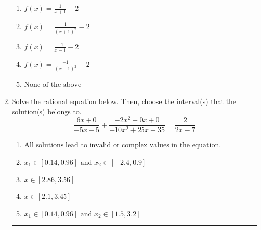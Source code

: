 \documentclass[14pt]{extbook}
\newcommand{\litem}[1]{\item#1\hspace*{-1cm}\rule{\textwidth}{0.4pt}}
\begin{document}
\begin{enumerate}
{\begin{center}
\end{center}
\begin{enumerate}[label=\Alph*.]
\item \( f(x) = \frac{1}{x + 1} - 2 \)
\item \( f(x) = \frac{1}{(x + 1)^2} - 2 \)
\item \( f(x) = \frac{-1}{x - 1} - 2 \)
\item \( f(x) = \frac{-1}{(x - 1)^2} - 2 \)
\item \( \text{None of the above} \)

\end{enumerate} }
\litem{
Solve the rational equation below. Then, choose the interval(s) that the solution(s) belongs to.\[ \frac{6x + 0}{-5x -5} + \frac{-2x^{2} +0 x + 0}{-10x^{2} +25 x + 35} = \frac{2}{2x -7} \]\begin{enumerate}[label=\Alph*.]
\item \( \text{All solutions lead to invalid or complex values in the equation.} \)
\item \( x_1 \in [0.14, 0.96] \text{ and } x_2 \in [-2.4,0.9] \)
\item \( x \in [2.86,3.56] \)
\item \( x \in [2.1,3.45] \)
\item \( x_1 \in [0.14, 0.96] \text{ and } x_2 \in [1.5,3.2] \)

\end{enumerate} }
\end{enumerate}
\end{document}
